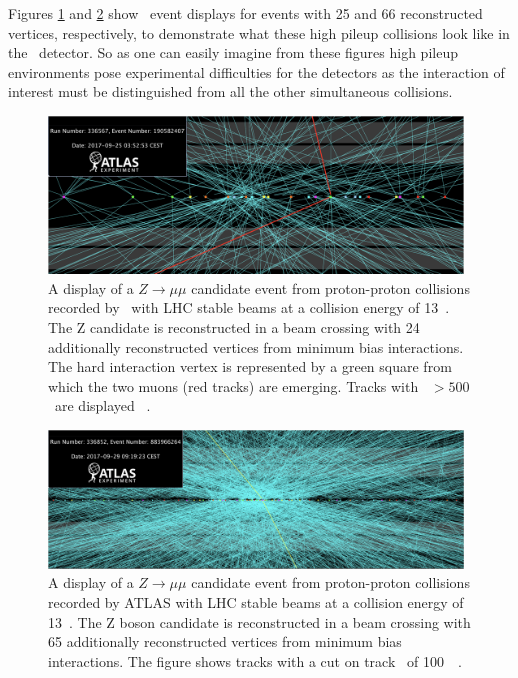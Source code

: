 Figures \ref{fig:detector:pileup25} and \ref{fig:detector:pileup65} show \ATLAS\ event displays for events with 25 and 66 reconstructed vertices, respectively, to demonstrate what these high pileup collisions look like in the \ATLAS\ detector.
So as one can easily imagine from these figures high pileup environments pose experimental difficulties for the detectors as the interaction of interest must be distinguished from all the other simultaneous collisions. 
\begin{figure}[h]
  \begin{center}
    \includegraphics[width=0.98\textwidth]{figs/detector/pileup25.png}
  \end{center}
  \caption[A Z candidate is reconstructed in a beam crossing with 24 additionally reconstructed vertices from minimum bias interactions.]
          {A display of a $Z\rightarrow \mu\mu$ candidate event from proton-proton collisions recorded by \ATLAS\ with LHC stable beams at a collision energy of 13~\TeV.
          The Z candidate is reconstructed in a beam crossing with 24 additionally reconstructed vertices from minimum bias interactions.
          The hard interaction vertex is represented by a green square from which the two muons (red tracks) are emerging. Tracks with \pt\ $> 500$~\MeV are displayed ~\cite{Pileup25}.}
  \label{fig:detector:pileup25}
\end{figure}
\begin{figure}[h]
  \begin{center}
    \includegraphics[width=0.98\textwidth]{figs/detector/pileup65.png}
  \end{center}
  \caption[A Z boson candidate is reconstructed in a beam crossing with 65 additionally reconstructed vertices from minimum bias interactions]
          {A display of a $Z\rightarrow \mu\mu$ candidate event from proton-proton collisions recorded by ATLAS with LHC stable beams at a collision energy of 13~\TeV. The Z boson candidate is reconstructed in a beam crossing with 65 additionally reconstructed vertices from minimum bias interactions.
          The figure shows tracks with a cut on track \pt\ of 100~\MeV~\cite{Pileup65}.}
  \label{fig:detector:pileup65}
\end{figure}





